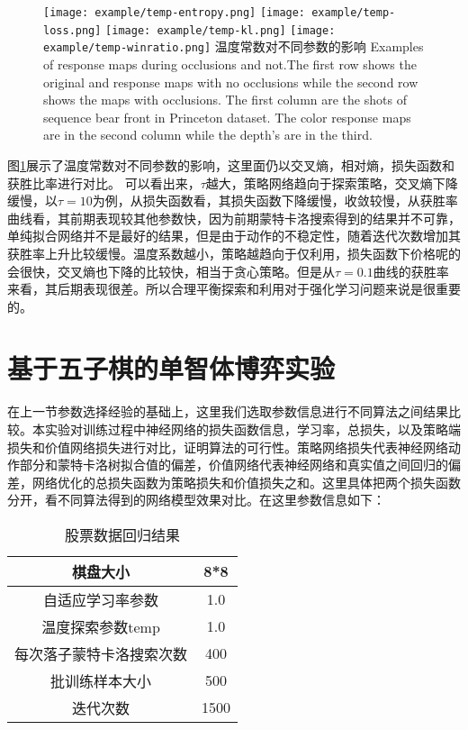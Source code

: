 \begin{figure}[t]
	\centering
	{\texttt{[image: example/temp-entropy.png]}}
	\hspace{0.5em}
	{\texttt{[image: example/temp-loss.png]}}
	\newline
	\centering
	{\texttt{[image: example/temp-kl.png]}}
	\hspace{0.5em}
	{\texttt{[image: example/temp-winratio.png]}}
	\bicaption
	{温度常数对不同参数的影响}
	{Examples of response maps during occlusions and not.The first row shows the original and response maps with no occlusions while the second row shows the maps with occlusions. The first column are the shots of sequence bear front in Princeton dataset. The color response maps are in the second column while the depth’s are in the third.}
	\label{fig2:response}
\end{figure}
图\ref{fig2:response}展示了温度常数对不同参数的影响，这里面仍以交叉熵，相对熵，损失函数和获胜比率进行对比。
可以看出来，$\tau$越大，策略网络趋向于探索策略，交叉熵下降缓慢，以$\tau=10$为例，从损失函数看，其损失函数下降缓慢，收敛较慢，从获胜率曲线看，其前期表现较其他参数快，因为前期蒙特卡洛搜索得到的结果并不可靠，单纯拟合网络并不是最好的结果，但是由于动作的不稳定性，随着迭代次数增加其获胜率上升比较缓慢。温度系数越小，策略越趋向于仅利用，损失函数下价格呢的会很快，交叉熵也下降的比较快，相当于贪心策略。但是从$\tau=0.1$曲线的获胜率来看，其后期表现很差。所以合理平衡探索和利用对于强化学习问题来说是很重要的。
\section{基于五子棋的单智体博弈实验}

在上一节参数选择经验的基础上，这里我们选取参数信息进行不同算法之间结果比较。本实验对训练过程中神经网络的损失函数信息，学习率，总损失，以及策略端损失和价值网络损失进行对比，证明算法的可行性。策略网络损失代表神经网络动作部分和蒙特卡洛树拟合值的偏差，价值网络代表神经网络和真实值之间回归的偏差，网络优化的总损失函数为策略损失和价值损失之和。这里具体把两个损失函数分开，看不同算法得到的网络模型效果对比。在这里参数信息如下：
\begin{table}
	\centering
	\caption{股票数据回归结果}
	\begin{tabular}{c|c}
		\hline 
		棋盘大小 & 8*8 \\ 
		\hline 
		自适应学习率参数 & 1.0 \\ 
		\hline 
		温度探索参数temp & 1.0 \\ 
		\hline 
		每次落子蒙特卡洛搜索次数 & 400 \\ 
		\hline 
		批训练样本大小 & 500 \\ 
		\hline 
		迭代次数 & 1500 \\ 
		\hline 
	\end{tabular} 
\end{table}


